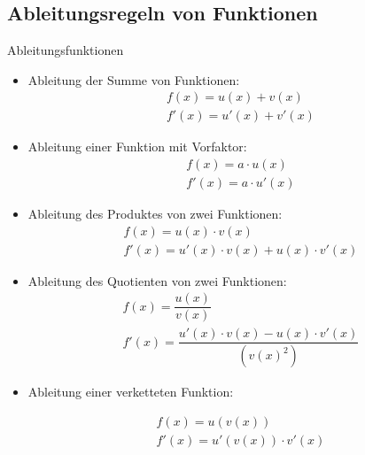 \subsection{Ableitungsregeln von Funktionen}
\begin{defi}{Ableitungsfunktionen}{}
\begin{multicols}{2}
\begin{itemize}
    \item Ableitung der Summe von Funktionen:
    \begin{gather*} 
	f(x) = u(x) + v(x) \\
	f'(x) = u'(x)+ v'(x)
	\end{gather*}
     \item Ableitung einer Funktion mit Vorfaktor:
    \begin{gather*} 
	f(x) = a\cdot u(x)  \\
	f'(x) = a\cdot u'(x) 
	\end{gather*}
       \item Ableitung des Produktes von zwei Funktionen:
    \begin{gather*} 
	f(x) = u(x) \cdot v(x)  \\
	f'(x) = u'(x) \cdot v(x) + u(x) \cdot v'(x)
	\end{gather*}     
        \item Ableitung des Quotienten von zwei Funktionen:
    \begin{gather*} 
	f(x) = \dfrac{u(x)}{v(x)}  \\
	f'(x) = \dfrac{u'(x)\cdot v(x) - u(x) \cdot v'(x)}{(v(x)^2)}
	\end{gather*} 
         \item Ableitung einer verketteten Funktion:

   \begin{gather*} 
	f(x) = u(v(x))  \\
	f'(x) = u'(v(x)) \cdot v'(x)
	\end{gather*} 

\end{itemize}   
\end{multicols}
\end{defi}
